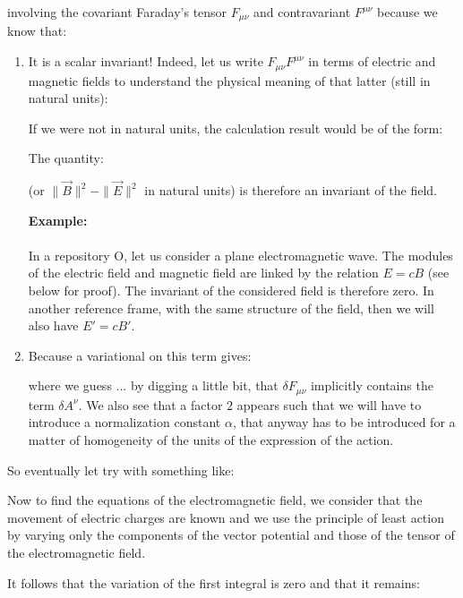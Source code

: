 	involving the covariant Faraday's tensor $F_{\mu\nu}$ and contravariant $F^{\mu \nu}$ because we know that:
	\begin{enumerate}
		\item It is a scalar invariant! Indeed, let us write $F_{\mu\nu}F^{\mu\nu}$ in terms of electric and magnetic fields to understand the physical meaning of that latter (still in natural units)\label{electromagnetic tensor invariant proof}:
		
		\begin{tcolorbox}[title=Remark,colframe=black,arc=10pt]
		If we were not in natural units, the calculation result would be of the form:
		
		The quantity:
		
		(or $\|\vec{B}\|^2-\|\vec{E}\|^2$ in natural units) is therefore an invariant of the field.
		\end{tcolorbox}
		\begin{tcolorbox}[colframe=black,colback=white,sharp corners]
		\textbf{{\Large {}}Example:}\\\\
		In a repository O, let us consider a plane electromagnetic wave. The modules of the electric field and magnetic field are linked by the relation $E=cB$ (see below for proof). The invariant of the considered field is therefore zero. In another reference frame, with the same structure of the field, then we will also have $E'=cB'$.
		\end{tcolorbox}
		
		\item Because a variational on this term gives:
		
		where we guess ... by digging a little bit, that $\delta F_{\mu\nu}$ implicitly contains the term $\delta A^\nu$. We also see that a factor $2$ appears such that we will have to introduce a normalization constant $\alpha$,  that anyway has to be introduced for a matter of homogeneity of the units of the expression of the action.
	\end{enumerate}
	
	So eventually let try with something like:
	
	Now to find the equations of the electromagnetic field, we consider that the movement of electric charges are known and we use the principle of least action by varying only the components of the vector potential and those of the tensor of the electromagnetic field.

	It follows that the variation of the first integral is zero and that it remains:
	
